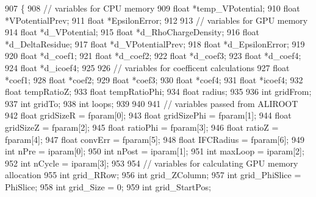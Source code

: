 \begin{DoxyCode}
907 \{
908     \textcolor{comment}{// variables for CPU memory}
909     \textcolor{keywordtype}{float} *temp\_VPotential;
910     \textcolor{keywordtype}{float} *VPotentialPrev;
911     \textcolor{keywordtype}{float} *EpsilonError;    
912 
913     \textcolor{comment}{// variables for GPU memory }
914     \textcolor{keywordtype}{float} *d\_VPotential;
915     \textcolor{keywordtype}{float} *d\_RhoChargeDensity;
916     \textcolor{keywordtype}{float} *d\_DeltaResidue;
917     \textcolor{keywordtype}{float} *d\_VPotentialPrev;
918     \textcolor{keywordtype}{float} *d\_EpsilonError;
919     
920     \textcolor{keywordtype}{float} *d\_coef1;
921     \textcolor{keywordtype}{float} *d\_coef2;
922     \textcolor{keywordtype}{float} *d\_coef3;
923     \textcolor{keywordtype}{float} *d\_coef4;
924     \textcolor{keywordtype}{float} *d\_icoef4;
925 
926     \textcolor{comment}{// variables for coefficent calculations}
927     \textcolor{keywordtype}{float} *coef1;
928     \textcolor{keywordtype}{float} *coef2;
929     \textcolor{keywordtype}{float} *coef3;
930     \textcolor{keywordtype}{float} *coef4;
931     \textcolor{keywordtype}{float} *icoef4;
932     \textcolor{keywordtype}{float} tempRatioZ;
933     \textcolor{keywordtype}{float} tempRatioPhi;
934     \textcolor{keywordtype}{float} radius;
935 
936     \textcolor{keywordtype}{int} gridFrom;
937     \textcolor{keywordtype}{int} gridTo; 
938     \textcolor{keywordtype}{int} loops;
939 
940 
941     \textcolor{comment}{// variables passed from ALIROOT}
942     \textcolor{keywordtype}{float} gridSizeR     = fparam[0];
943     \textcolor{keywordtype}{float} gridSizePhi   = fparam[1];
944     \textcolor{keywordtype}{float} gridSizeZ     = fparam[2];
945     \textcolor{keywordtype}{float} ratioPhi      = fparam[3];
946     \textcolor{keywordtype}{float} ratioZ        = fparam[4];
947     \textcolor{keywordtype}{float} convErr       = fparam[5];
948     \textcolor{keywordtype}{float} IFCRadius     = fparam[6];
949     \textcolor{keywordtype}{int} nPre        = iparam[0];
950     \textcolor{keywordtype}{int} nPost       = iparam[1];
951     \textcolor{keywordtype}{int} maxLoop     = iparam[2];
952     \textcolor{keywordtype}{int} nCycle      = iparam[3];
953 
954     \textcolor{comment}{// variables for calculating GPU memory allocation}
955     \textcolor{keywordtype}{int} grid\_RRow;
956     \textcolor{keywordtype}{int} grid\_ZColumn;
957     \textcolor{keywordtype}{int} grid\_PhiSlice = PhiSlice;
958     \textcolor{keywordtype}{int} grid\_Size = 0;
959     \textcolor{keywordtype}{int} grid\_StartPos;

\end{DoxyCode}
